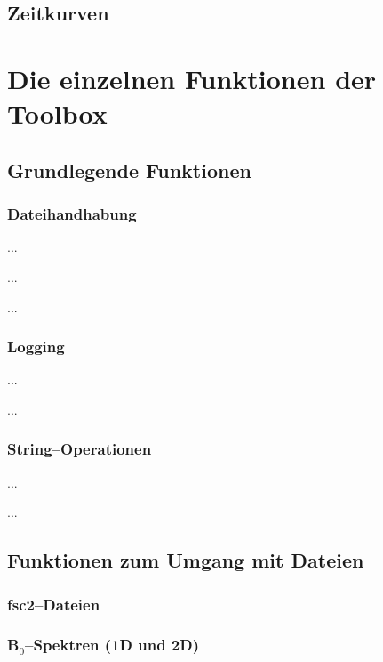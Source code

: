 \documentclass[a4paper]{refart}
\begin{document}
\subsection{Zeitkurven}




\section{Die einzelnen Funktionen der Toolbox}

\subsection{Grundlegende Funktionen}

\subsubsection{Dateihandhabung}

...

...

...


\subsubsection{Logging}

...

...


\subsubsection{String--Operationen}

...

...


\subsection{Funktionen zum Umgang mit Dateien}

\subsubsection{fsc2--Dateien}


\subsubsection{B$_0$--Spektren (1D und 2D)}
\end{document}
